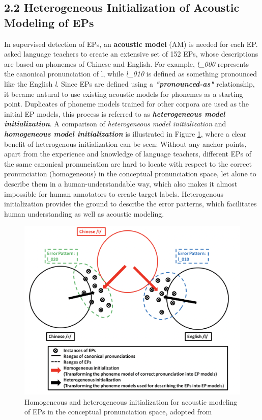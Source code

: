 \documentclass[nobib]{tufte-handout}
\begin{document}
\subsection{2.2 \textbf{Heterogeneous Initialization of Acoustic Modeling of EPs}}

In supervised detection of EPs, an \textbf{acoustic model} (AM) is needed for each EP. \cite{wang2015supervised} asked language teachers to create an extensive set of 152 EPs, whose descriptions are based on phonemes of Chinese and English. For example, \textit{l\_000} represents the canonical pronunciation of l, while \textit{l\_010} is defined as something pronounced like the English \textit{l}. Since EPs are defined using a  \textbf{\textit{"pronounced-as"}} relationship, it became natural to use existing acoustic models for phonemes as a starting point. Duplicates of phoneme models trained for other corpora are used as the initial EP models, this process is referred to as \textbf{\textit{heterogeneous model initialization}}. A comparison of \textit{heterogeneous model initialization} and \textbf{\textit{homogeneous model initialization}} is illustrated in Figure \ref{fig:init}, where a clear benefit of heterogenous initialization can be seen: Without any anchor points, apart from the experience and knowledge of language teachers, different EPs of the same canonical pronunciation are hard to locate with respect to the correct pronunciation (homogeneous) in the conceptual pronunciation space, let alone to describe them in a human-understandable way, which also makes it almost impossible for human annotators to create target labels. Heterogenous initialization provides the ground to describe the error patterns, which facilitates human understanding as well as acoustic modeling.

\begin{figure}
  \includegraphics{init.png}
  \caption{Homogeneous and heterogeneous initialization for acoustic modeling
of EPs in the conceptual pronunciation space, adopted from \cite{wang2015supervised}}
  \label{fig:init}
\end{figure}
\end{document}
